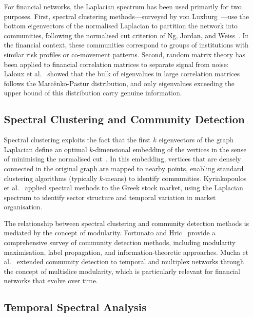 For financial networks, the Laplacian spectrum has been used primarily
for two purposes.  First, spectral clustering methods---surveyed by von
Luxburg~\cite{luxburg2007tutorial}---use the bottom eigenvectors of the
normalised Laplacian to partition the network into communities,
following the normalised cut criterion of Ng, Jordan, and
Weiss~\cite{ng2002spectral}.  In the financial context, these
communities correspond to groups of institutions with similar risk
profiles or co-movement patterns.  Second, random matrix theory has
been applied to financial correlation matrices to separate signal from
noise: Laloux et al.~\cite{laloux1999noise} showed that the bulk of
eigenvalues in large correlation matrices follows the Marc\v{e}nko-Pastur
distribution, and only eigenvalues exceeding the upper bound of this
distribution carry genuine information.

\subsection{Spectral Clustering and Community Detection}
\label{sec:spectral_clustering}

Spectral clustering exploits the fact that the first $k$ eigenvectors
of the graph Laplacian define an optimal $k$-dimensional embedding of
the vertices in the sense of minimising the normalised
cut~\cite{ng2002spectral,luxburg2007tutorial}.  In this embedding,
vertices that are densely connected in the original graph are mapped to
nearby points, enabling standard clustering algorithms (typically
$k$-means) to identify communities.  Kyriakopoulos
et al.~\cite{kyriakopoulos2009network} applied spectral methods to
the Greek stock market, using the Laplacian spectrum to identify sector
structure and temporal variation in market organisation.

The relationship between spectral clustering and community detection
methods is mediated by the concept of modularity.  Fortunato and
Hric~\cite{fortunato2016community} provide a comprehensive survey of
community detection methods, including modularity maximisation, label
propagation, and information-theoretic approaches.  Mucha
et al.~\cite{mucha2010community} extended community detection to
temporal and multiplex networks through the concept of multislice
modularity, which is particularly relevant for financial networks that
evolve over time.

\subsection{Temporal Spectral Analysis}
\label{sec:temporal_spectral}

